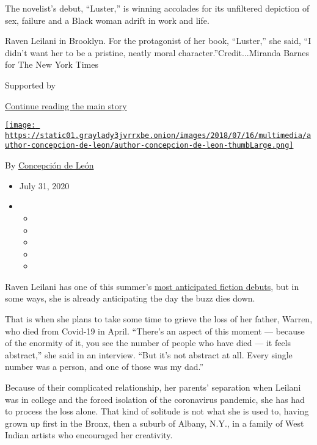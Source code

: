 The novelist's debut, ``Luster,'' is winning accolades for its
unfiltered depiction of sex, failure and a Black woman adrift in work
and life.

Raven Leilani in Brooklyn. For the protagonist of her book, ``Luster,''
she said, ``I didn't want her to be a pristine, neatly moral
character.''Credit...Miranda Barnes for The New York Times

Supported by

\protect\hyperlink{after-sponsor}{Continue reading the main story}

\href{https://www.nytimes3xbfgragh.onion/by/concepcion-de-leon}{\texttt{[image: https://static01.graylady3jvrrxbe.onion/images/2018/07/16/multimedia/author-concepcion-de-leon/author-concepcion-de-leon-thumbLarge.png]}}

By
\href{https://www.nytimes3xbfgragh.onion/by/concepcion-de-leon}{Concepción
de León}

\begin{itemize}
\item
  July 31, 2020
\item
  \begin{itemize}
  \item
  \item
  \item
  \item
  \item
  \end{itemize}
\end{itemize}

Raven Leilani has one of this summer's
\href{https://www.nytimes3xbfgragh.onion/2020/07/30/books/new-august-books.html}{most
anticipated fiction debuts}, but in some ways, she is already
anticipating the day the buzz dies down.

That is when she plans to take some time to grieve the loss of her
father, Warren, who died from Covid-19 in April. ``There's an aspect of
this moment --- because of the enormity of it, you see the number of
people who have died --- it feels abstract,'' she said in an interview.
``But it's not abstract at all. Every single number was a person, and
one of those was my dad.''

Because of their complicated relationship, her parents' separation when
Leilani was in college and the forced isolation of the coronavirus
pandemic, she has had to process the loss alone. That kind of solitude
is not what she is used to, having grown up first in the Bronx, then a
suburb of Albany, N.Y., in a family of West Indian artists who
encouraged her creativity.

